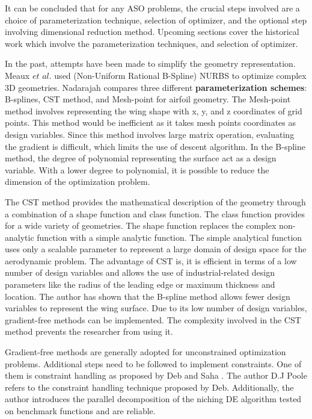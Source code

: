 It can be concluded that for any ASO problems, the crucial steps involved are a choice of parameterization technique, selection of optimizer, and the optional step involving dimensional reduction method. Upcoming sections cover the historical work which involve the parameterization techniques, and selection of optimizer.

In the past, attempts have been made to simplify the geometry representation. Meaux $et$  $al$. \cite{Meaux} used (Non-Uniform Rational B-Spline) NURBS to optimize complex 3D geometries. Nadarajah\cite{Nadarajah} compares three different \textbf{parameterization schemes}: B-splines, CST method, and Mesh-point for airfoil geometry. The Mesh-point method involves representing the wing shape with x, y, and z coordinates of grid points. This method would be inefficient as it takes mesh points coordinates as design variables. Since this method involves large matrix operation, evaluating the gradient is difficult, which limits the use of descent algorithm. In the B-spline method, the degree of polynomial representing the surface act as a design variable. With a lower degree to polynomial, it is possible to reduce the dimension of the optimization problem.

The CST method provides the mathematical description of the geometry through a combination of a shape function and class function. The class function provides for a wide variety of geometries. The shape function replaces the complex non-analytic function with a simple analytic function. The simple analytical function uses only a scalable parameter to represent a large domain of design space for the aerodynamic problem. The advantage of CST is, it is efficient in terms of a low number of design variables and allows the use of industrial-related design parameters like the radius of the leading edge or maximum thickness and location\cite{Nadarajah}. The author has shown that the B-spline method allows fewer design variables to represent the wing surface. Due to its low number of design variables, gradient-free methods can be implemented. The complexity involved in the CST method prevents the researcher from using it. 

Gradient-free methods are generally adopted for unconstrained optimization problems. Additional steps need to be followed to implement constraints. One of them is constraint handling as proposed by Deb and Saha \cite{Deb}. The author D.J Poole \cite{Poole2} refers to the constraint handling technique proposed by Deb. Additionally, the author introduces the parallel decomposition of the niching DE algorithm tested on benchmark functions and are reliable.

